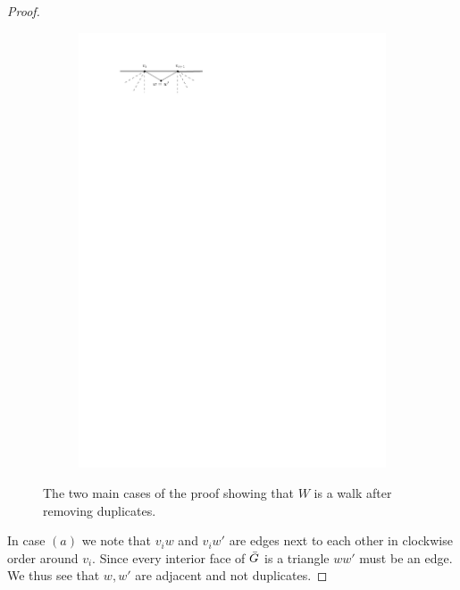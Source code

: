 \begin{proof}
\begin{figure}
\begin{subfigure}[b]{0.5\linewidth}
        \caption{}
    \end{subfigure}%
    \begin{subfigure}[b]{0.5\linewidth}
        \includegraphics[width=\linewidth]{img/walkProofB}
        \vspace{1cm}   
                
        \caption{}
    \end{subfigure}

    	\caption{The two main cases of the proof showing that $W$ is a walk after removing duplicates.}
	\label{fig:walkproof}
\end{figure}


In case $(a)$ we note that $v_i w$ and $v_i w'$ are edges next to each other in clockwise order around $v_i$. Since every interior face of $\bar{G}$ is a triangle $ww'$ must be an edge. We thus see that $w, w'$ are adjacent and not duplicates.


\end{proof}
